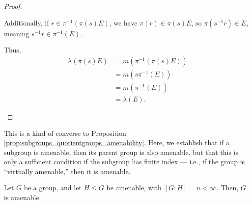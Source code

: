 \begin{proof}
\begin{enumerate}[(1)]
      Additionally, if $r\in \pi^{-1}\left(\pi(s)E\right)$, we have $\pi(r)\in \pi(s)E$, so $\pi\left(s^{-1}r\right)\in E$, meaning $s^{-1}r\in \pi^{-1}(E)$.\newline

      Thus,
      \begin{align*}
        \lambda\left(\pi\left(s\right)E\right) &= m\left(\pi^{-1}\left(\pi\left(s\right)E\right)\right)\\
                                               &= m\left(s\pi^{-1}\left(E\right)\right)\\
                                               &= m\left(\pi^{-1}\left(E\right)\right)\\
                                               &= \lambda\left(E\right).
      \end{align*}
  \end{enumerate}
\end{proof}
This is a kind of converse to Proposition \ref{prop:subgroups_quotientgroups_amenability}. Here, we establish that if a subgroup is amenable, then its parent group is also amenable, but that this is only a sufficient condition if the subgroup has finite index --- i.e., if the group is ``virtually amenable,'' then it is amenable.
\begin{proposition}\label{prop:finite_index_amenable_subgroup}
  Let $G$ be a group, and let $H\leq G$ be amenable, with $\left[G:H\right]  = n < \infty$. Then, $G$ is amenable.
\end{proposition}

